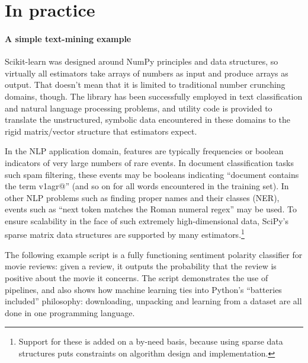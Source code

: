 \documentclass[a4paper]{article}
\begin{document}
\section{In practice}

\paragraph{A simple text-mining example}
%

Scikit-learn was designed around NumPy principles and data structures,
so virtually all estimators take arrays of numbers as input
and produce arrays as output.
That doesn't mean that it is limited to traditional number crunching domains,
though.
The library has been successfully employed in text classification
and natural language processing problems,
and utility code is provided to translate the unstructured, symbolic data
encountered in these domains
to the rigid matrix/vector structure that estimators expect.

In the NLP application domain,
features are typically frequencies or boolean indicators
of very large numbers of rare events.
In document classification tasks such spam filtering,
these events may be booleans indicating
``document contains the term \textsf{v1agr@}''
(and so on for all words encountered in the training set).
In other NLP problems such as finding proper names and their classes (NER),
events such as ``next token matches the Roman numeral regex'' may be used.
To ensure scalability in the face of such extremely high-dimensional data,
SciPy's sparse matrix data structures are supported by many estimators.\footnote{
  Support for these is added on a by-need basis,
  because using sparse data structures puts constraints on algorithm design
  and implementation.
}

\begin{figure}

\end{figure}

The following example script is a fully functioning
sentiment polarity classifier for movie reviews:
given a review, it outputs the probability that the review is positive
about the movie it concerns.
The script demonstrates the use of pipelines,
and also shows how machine learning ties into Python's
``batteries included'' philosophy:
downloading, unpacking and learning from a dataset
are all done in one programming language.
\end{document}
